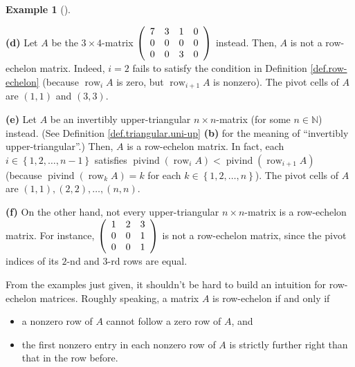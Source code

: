 \documentclass[numbers=enddot,12pt,final,onecolumn,notitlepage]{scrartcl}%
\theoremstyle{definition}
\newtheorem{exam}[theo]{Example}
\newenvironment{example}[1][]
{\begin{exam}[#1]\begin{leftbar}}
{\end{leftbar}\end{exam}}
\begin{document}
\begin{example}
\textbf{(d)} Let $A$ be the $3\times4$-matrix $\left(
\begin{array}
[c]{cccc}%
7 & 3 & 1 & 0\\
0 & 0 & 0 & 0\\
0 & 0 & 3 & 0
\end{array}
\right)  $ instead. Then, $A$ is not a row-echelon matrix. Indeed, $i=2$ fails
to satisfy the condition in Definition \ref{def.row-echelon} (because
$\operatorname*{row}\nolimits_{i}A$ is zero, but $\operatorname*{row}%
\nolimits_{i+1}A$ is nonzero). The pivot cells of $A$ are $\left(  1,1\right)
$ and $\left(  3,3\right)  $.

\textbf{(e)} Let $A$ be an invertibly upper-triangular $n\times n$-matrix (for
some $n\in\mathbb{N}$) instead. (See Definition \ref{def.triangular.uni-up}
\textbf{(b)} for the meaning of \textquotedblleft invertibly
upper-triangular\textquotedblright.) Then, $A$ is a row-echelon matrix. In
fact, each $i\in\left\{  1,2,\ldots,n-1\right\}  $ satisfies
$\operatorname*{pivind}\left(  \operatorname*{row}\nolimits_{i}A\right)
<\operatorname*{pivind}\left(  \operatorname*{row}\nolimits_{i+1}A\right)  $
(because $\operatorname*{pivind}\left(  \operatorname*{row}\nolimits_{k}%
A\right)  =k$ for each $k\in\left\{  1,2,\ldots,n\right\}  $). The pivot cells
of $A$ are $\left(  1,1\right)  ,\left(  2,2\right)  ,\ldots,\left(
n,n\right)  $.

\textbf{(f)} On the other hand, not every upper-triangular $n\times n$-matrix
is a row-echelon matrix. For instance, $\left(
\begin{array}
[c]{ccc}%
1 & 2 & 3\\
0 & 0 & 1\\
0 & 0 & 1
\end{array}
\right)  $ is not a row-echelon matrix, since the pivot indices of its $2$-nd
and $3$-rd rows are equal.
\end{example}

From the examples just given, it shouldn't be hard to build an intuition for
row-echelon matrices. Roughly speaking, a matrix $A$ is row-echelon if and
only if

\begin{itemize}
\item a nonzero row of $A$ cannot follow a zero row of $A$, and

\item the first nonzero entry in each nonzero row of $A$ is strictly further
right than that in the row before.
\end{itemize}
\end{document}
